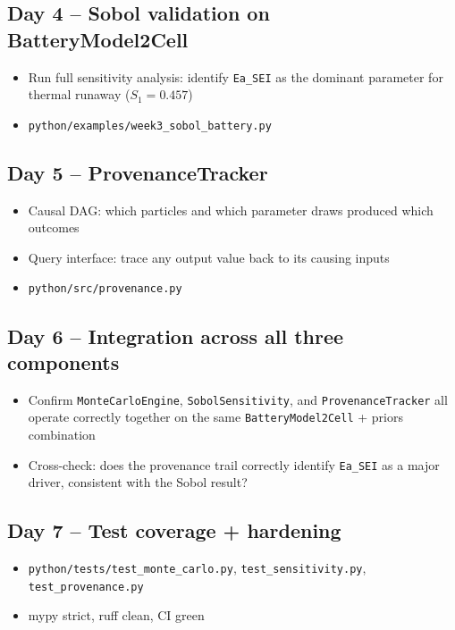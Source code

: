 \documentclass[11pt]{article}
\begin{document}
\subsection*{Day 4 -- Sobol validation on BatteryModel2Cell}
\begin{itemize}[leftmargin=*]
  \item Run full sensitivity analysis: identify \texttt{Ea\_SEI} as the
    dominant parameter for thermal runaway ($S_1 = 0.457$)
  \item \texttt{python/examples/week3\_sobol\_battery.py}
\end{itemize}

\subsection*{Day 5 -- ProvenanceTracker}
\begin{itemize}[leftmargin=*]
  \item Causal DAG: which particles and which parameter draws produced
    which outcomes
  \item Query interface: trace any output value back to its causing
    inputs
  \item \texttt{python/src/provenance.py}
\end{itemize}

\subsection*{Day 6 -- Integration across all three components}
\begin{itemize}[leftmargin=*]
  \item Confirm \texttt{MonteCarloEngine}, \texttt{SobolSensitivity},
    and \texttt{ProvenanceTracker} all operate correctly together on
    the same \texttt{BatteryModel2Cell} + priors combination
  \item Cross-check: does the provenance trail correctly identify
    \texttt{Ea\_SEI} as a major driver, consistent with the Sobol
    result?
\end{itemize}

\subsection*{Day 7 -- Test coverage + hardening}
\begin{itemize}[leftmargin=*]
  \item \texttt{python/tests/test\_monte\_carlo.py},
    \texttt{test\_sensitivity.py}, \texttt{test\_provenance.py}
  \item mypy strict, ruff clean, CI green
\end{itemize}
\end{document}
